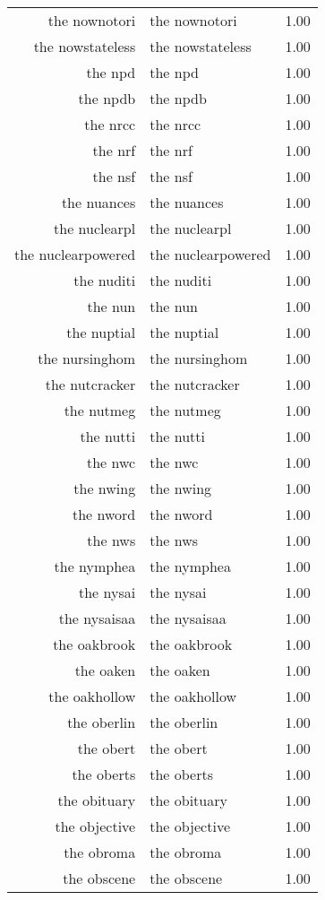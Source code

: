 \begin{table}[ht]
\begin{tabular}{rlr}
  the nownotori & the nownotori & 1.00 \\ 
  the nowstateless & the nowstateless & 1.00 \\ 
  the npd & the npd & 1.00 \\ 
  the npdb & the npdb & 1.00 \\ 
  the nrcc & the nrcc & 1.00 \\ 
  the nrf & the nrf & 1.00 \\ 
  the nsf & the nsf & 1.00 \\ 
  the nuances & the nuances & 1.00 \\ 
  the nuclearpl & the nuclearpl & 1.00 \\ 
  the nuclearpowered & the nuclearpowered & 1.00 \\ 
  the nuditi & the nuditi & 1.00 \\ 
  the nun & the nun & 1.00 \\ 
  the nuptial & the nuptial & 1.00 \\ 
  the nursinghom & the nursinghom & 1.00 \\ 
  the nutcracker & the nutcracker & 1.00 \\ 
  the nutmeg & the nutmeg & 1.00 \\ 
  the nutti & the nutti & 1.00 \\ 
  the nwc & the nwc & 1.00 \\ 
  the nwing & the nwing & 1.00 \\ 
  the nword & the nword & 1.00 \\ 
  the nws & the nws & 1.00 \\ 
  the nymphea & the nymphea & 1.00 \\ 
  the nysai & the nysai & 1.00 \\ 
  the nysaisaa & the nysaisaa & 1.00 \\ 
  the oakbrook & the oakbrook & 1.00 \\ 
  the oaken & the oaken & 1.00 \\ 
  the oakhollow & the oakhollow & 1.00 \\ 
  the oberlin & the oberlin & 1.00 \\ 
  the obert & the obert & 1.00 \\ 
  the oberts & the oberts & 1.00 \\ 
  the obituary & the obituary & 1.00 \\ 
  the objective & the objective & 1.00 \\ 
  the obroma & the obroma & 1.00 \\ 
  the obscene & the obscene & 1.00 \\ 

\end{tabular}
\end{table}
